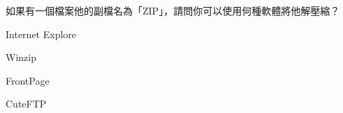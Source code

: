 \ifx\ntpcNinetyTwo\undefined[92學年基北區] \fi
如果有一個檔案他的副檔名為「ZIP」，請問你可以使用何種軟體將他解壓縮？
  \begin{optionlist}
  \item Internet Explore
  \item Winzip\label{ntpc-92-a35}
  \item FrontPage
  \item CuteFTP
  \end{optionlist}